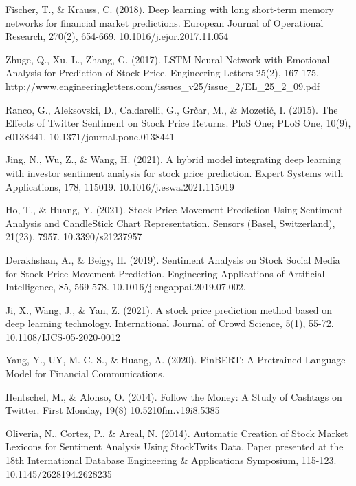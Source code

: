 \documentclass{llncs}
\begin{document}
\begin{thebibliography}{8}
\label{ref_article8} 
Fischer, T., \& Krauss, C. (2018). Deep learning with long short-term memory networks for financial market predictions. European Journal of Operational Research, 270(2), 654-669. 10.1016/j.ejor.2017.11.054

\label{ref_article9} 
Zhuge, Q., Xu, L., Zhang, G. (2017). LSTM Neural Network with Emotional Analysis for Prediction of Stock Price. Engineering Letters 25(2), 167-175. http://www.engineeringletters.com/issues\_v25/issue\_2/EL\_25\_2\_09.pdf

\label{ref_article10} 
Ranco, G., Aleksovski, D., Caldarelli, G., Grčar, M., \& Mozetič, I. (2015). The Effects of Twitter Sentiment on Stock Price Returns. PloS One; PLoS One, 10(9), e0138441. 10.1371/journal.pone.0138441

\label{ref_article11} 
Jing, N., Wu, Z., \& Wang, H. (2021). A hybrid model integrating deep learning with investor sentiment analysis for stock price prediction. Expert Systems with Applications, 178, 115019. 10.1016/j.eswa.2021.115019

\label{ref_article12}
Ho, T., \& Huang, Y. (2021). Stock Price Movement Prediction Using Sentiment Analysis and CandleStick Chart Representation. Sensors (Basel, Switzerland), 21(23), 7957. 10.3390/s21237957

\label{ref_article13}
Derakhshan, A., \& Beigy, H. (2019). Sentiment Analysis on Stock Social Media for Stock Price Movement Prediction. Engineering Applications of Artificial Intelligence, 85, 569-578. 10.1016/j.engappai.2019.07.002.

\label{ref_article14}
Ji, X., Wang, J., \& Yan, Z. (2021). A stock price prediction method based on deep learning technology. International Journal of Crowd Science, 5(1), 55-72. 10.1108/IJCS-05-2020-0012

\label{ref_article15}
Yang, Y., UY, M. C. S., \& Huang, A. (2020). FinBERT: A Pretrained Language Model for Financial Communications.

\label{ref_article16}
Hentschel, M., \& Alonso, O. (2014). Follow the Money: A Study of Cashtags on Twitter. First Monday, 19(8) 10.5210\/fm.v19i8.5385

\label{ref_article17}
Oliveria, N., Cortez, P., \& Areal, N. (2014). Automatic Creation of Stock Market Lexicons for Sentiment Analysis Using StockTwits Data. Paper presented at the 18th International Database Engineering \& Applications Symposium, 115-123. 10.1145/2628194.2628235


\end{thebibliography}
\end{document}
